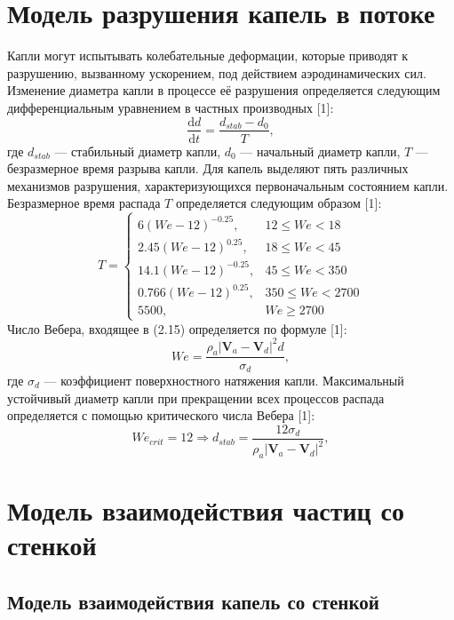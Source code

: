 \section{Модель разрушения капель в потоке}

Капли могут испытывать колебательные деформации, которые приводят к разрушению, вызванному ускорением, под действием аэродинамических сил. Изменение диаметра капли в процессе её разрушения определяется следующим дифференциальным уравнением в частных производных [1]:
\begin{equation}
	\frac{\mathrm{d} d}{\mathrm{d} t} = \frac{d_{stab} - d_0}{T},
\end{equation}
где $d_{stab}$ --- стабильный диаметр капли, $d_0$ --- начальный диаметр капли, $T$ --- безразмерное время разрыва капли. Для капель выделяют пять
различных механизмов разрушения, характеризующихся первоначальным состоянием капли.
Безразмерное время распада $T$ определяется следующим образом [1]:
\begin{equation}
	T = 
	\begin{cases}
		6 (We - 12)^{-0.25}, & 12 \leq We < 18 \\
		2.45(We-12)^{0.25}, & 18 \leq We < 45 \\
		14.1(We-12)^{-0.25}, & 45 \leq We < 350 \\
		0.766(We-12)^{0.25}, & 350 \leq We < 2700 \\
		5500, & We \geq 2700 
	\end{cases}
\end{equation}
Число Вебера, входящее в (2.15) определяется по формуле [1]:
\begin{equation}
	We = \frac{\rho_a \left| \mathbf{V}_a - \mathbf{V}_d \right|^2 d}{\sigma_d},
\end{equation}
где $\sigma_d$ --- коэффициент поверхностного натяжения капли. Максимальный устойчивый диаметр капли при прекращении всех процессов распада определяется с помощью критического числа Вебера [1]:
\begin{equation}
	We_{crit} = 12 \Rightarrow d_{stab} = \frac{12 \sigma_d}{\rho_a \left| \mathbf{V}_a - \mathbf{V}_d \right|^2},
\end{equation}

\section{Модель взаимодействия частиц со стенкой}

\subsection{Модель взаимодействия капель со стенкой}

